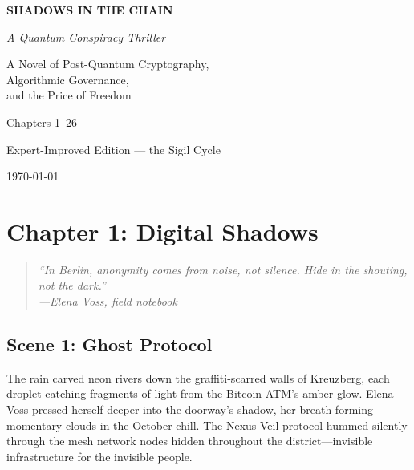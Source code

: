 \documentclass[12pt,letterpaper]{book}
\begin{document}
\begin{titlepage}
    \centering
    \vspace*{2cm}

    {\Huge\bfseries\color{neonblue} SHADOWS IN THE CHAIN\par}
    \vspace{1cm}
    {\Large\itshape A Quantum Conspiracy Thriller\par}
    \vspace{2cm}

    {\large\color{neongreen}
    A Novel of Post-Quantum Cryptography,\\
    Algorithmic Governance,\\
    and the Price of Freedom\\
    \par}

    \vfill

    {\large\color{neonpink} Chapters 1--26\par}
    {\large Expert-Improved Edition --- the Sigil Cycle\par}

    \vfill

    {\large \today\par}
\end{titlepage}

\tableofcontents
\newpage

\hypertarget{chapter-1-digital-shadows}{%
\section{Chapter 1: Digital Shadows}\label{chapter-1-digital-shadows}}

\begin{quote}
\itshape ``In Berlin, anonymity comes from noise, not silence. Hide in the
shouting, not the dark.''\\
\normalfont\hfill---Elena Voss, field notebook
\end{quote}

\hypertarget{scene-1-ghost-protocol}{%
\subsection{Scene 1: Ghost Protocol}\label{scene-1-ghost-protocol}}

The rain carved neon rivers down the graffiti-scarred walls of Kreuzberg, each droplet catching fragments of light from the Bitcoin ATM's amber glow. Elena Voss pressed herself deeper into the doorway's shadow, her breath forming momentary clouds in the October chill. The Nexus Veil protocol hummed silently through the mesh network nodes hidden throughout the district---invisible infrastructure for the invisible people.
\end{document}
